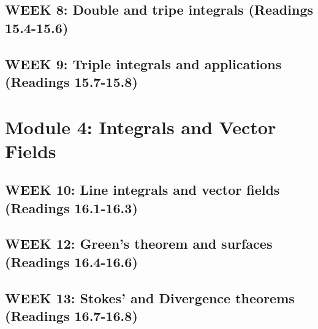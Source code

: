 \documentclass[12pt]{article}
\begin{document}
\subsection{WEEK 8: Double and tripe integrals (Readings 15.4-15.6)}

\subsection{WEEK 9: Triple integrals and applications (Readings 15.7-15.8)}

\pagebreak
\section{Module 4: Integrals and Vector Fields}
\subsection{WEEK 10: Line integrals and vector fields (Readings 16.1-16.3)}

\subsection{WEEK 12: Green's theorem and surfaces (Readings 16.4-16.6)}

\subsection{WEEK 13: Stokes' and Divergence theorems (Readings 16.7-16.8)}
\end{document}
